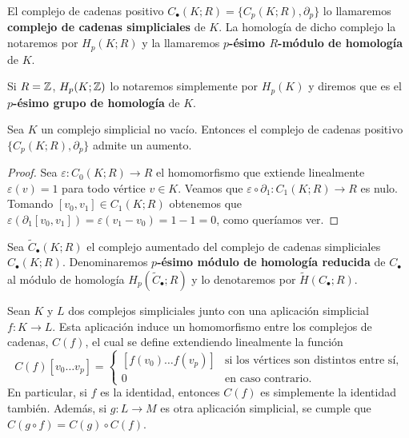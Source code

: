 \begin{definicion}
	El complejo de cadenas positivo $C_\bullet(K;R) = \{C_p(K;R), \partial_p\}$ lo llamaremos \textbf{complejo de cadenas simpliciales} de $K$. La homología de dicho complejo la notaremos por $H_p(K;R)$ y la llamaremos \textbf{$p$-ésimo $R$-módulo de homología} de $K$.
\end{definicion}
Si $R=\mathbb{Z}$, $H_p(K;\mathbb{Z})$ lo notaremos simplemente por $H_p(K)$ y diremos que es el \textbf{$p$-ésimo grupo de homología} de $K$.
\begin{proposicion}
	\label{prop:aumento}
	Sea $K$ un complejo simplicial no vacío. Entonces el complejo de cadenas positivo $\{ C_p(K;R), \partial_p \}$ admite un aumento.
\end{proposicion}
\begin{proof}
	Sea $\varepsilon: C_0(K;R) \to R$ el homomorfismo que extiende linealmente $\varepsilon(v) = 1$ para todo vértice $v \in K$. Veamos que $\varepsilon \circ \partial_1 : C_1(K;R) \to R$ es nulo. Tomando $[v_0,v_1] \in C_1(K;R)$ obtenemos que $\varepsilon (\partial_1[v_0,v_1]) = \varepsilon(v_1 - v_0) = 1-1 = 0$, como queríamos ver.
\end{proof}
\begin{definicion}
	Sea $\widetilde{C}_\bullet(K;R)$ el complejo aumentado del complejo de cadenas simpliciales $C_{\bullet}(K;R)$. Denominaremos \textbf{$p$-ésimo módulo de homología reducida} de $C_{\bullet}$ al módulo de homología $H_p(\widetilde{C}_{\bullet};R)$ y lo denotaremos por $\widetilde{H}(C_{\bullet};R)$.
\end{definicion}
\begin{proposicion}
	\label{prop:simpl_app_hom}
	Sean \(K\) y \(L\) dos complejos simpliciales junto con una aplicación simplicial \(f: K \to L\). Esta aplicación induce un homomorfismo entre los complejos de cadenas, \(C(f)\), el cual se define extendiendo linealmente la función
	\[
		C(f)[v_0 \dots v_p] =
		\begin{cases}
			[f(v_0) \dots f(v_p)] & \text{si los vértices son distintos entre sí}, \\
			0 & \text{en caso contrario}.
		\end{cases}
	\]
	En particular, si \(f\) es la identidad, entonces \(C(f)\) es simplemente la identidad también. Además, si \(g: L \longrightarrow M\) es otra aplicación simplicial, se cumple que \(C(g \circ f) = C(g) \circ C(f)\).
\end{proposicion}
